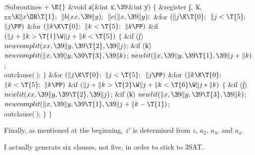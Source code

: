 \Y\B\4:Subroutines\X${}\mathrel+\E{}$\6
\&{void} \|a(\&{int} \|x${},\39{}$\&{int} \|y)\1\1\2\2\6
${}\{{}$\1\6
\&{register} \|j${},{}$ \|k${},{}$ \\{xx}${}\K\|x\OR\T{1};{}$\7
${}\|b(\\{xx},\39\|y);{}$\6
${}\|c(\|x,\39\|y);{}$\6
\&{for} ${}(\|j\K\T{0};{}$ ${}\|j<\T{5};{}$ ${}\|j\PP){}$\1\6
\&{for} ${}(\|k\K\T{0};{}$ ${}\|k<\T{5};{}$ ${}\|k\PP){}$\1\6
\&{if} ${}(\|j+\|k>\T{1}\W\|j+\|k<\T{5}){}$\5
${}\{{}$\1\6
\&{if} (\|j)\1\5
${}\\{newcomplit}(\\{xx},\39\|y,\39\T{2},\39\|j){}$;\2\6
\&{if} (\|k)\1\5
${}\\{newcomplit}(\|x,\39\|y,\39\T{3},\39\|k){}$;\2\6
${}\\{newlit}(\|x,\39\|y,\39\T{1},\39\|j+\|k){}$;\6
\\{outclause}(\,);\6
\4${}\}{}$\2\2\2\6
\&{for} ${}(\|j\K\T{0};{}$ ${}\|j<\T{5};{}$ ${}\|j\PP){}$\1\6
\&{for} ${}(\|k\K\T{0};{}$ ${}\|k<\T{5};{}$ ${}\|k\PP){}$\1\6
\&{if} ${}(\|j+\|k>\T{2}\W\|j+\|k<\T{6}\W\|j*\|k){}$\5
${}\{{}$\1\6
\&{if} (\|j)\1\5
${}\\{newlit}(\\{xx},\39\|y,\39\T{2},\39\|j){}$;\2\6
\&{if} (\|k)\1\5
${}\\{newlit}(\|x,\39\|y,\39\T{3},\39\|k){}$;\2\6
${}\\{newcomplit}(\|x,\39\|y,\39\T{1},\39\|j+\|k-\T{1}){}$;\6
\\{outclause}(\,);\6
\4${}\}{}$\2\2\2\6
\4${}\}{}$\2\par
\fi

Finally, as mentioned at the beginning, $z'$ is determined
from $z$, $a_2$, $a_3$, and $a_4$.

I actually generate six clauses, not five, in order to stick to
{\mc 3SAT}.

